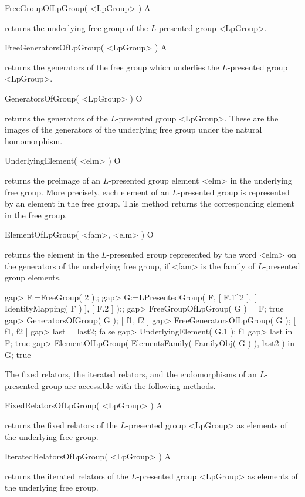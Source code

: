\> FreeGroupOfLpGroup( <LpGroup> ) A

returns the underlying free group of the $L$-presented group <LpGroup>. 

\> FreeGeneratorsOfLpGroup( <LpGroup> ) A

returns the generators of the free group which underlies the $L$-presented
group <LpGroup>.

\> GeneratorsOfGroup( <LpGroup> )  O
 
returns the generators of the $L$-presented group <LpGroup>. These are the 
images of the generators of the underlying free group under the natural
homomorphism.

\> UnderlyingElement( <elm> ) O

returns the preimage of an $L$-presented group element <elm> in the
underlying free group. More precisely, each element of an $L$-presented
group is represented by an element in the free group. This method returns
the corresponding element in the free group.

\> ElementOfLpGroup( <fam>, <elm> ) O

returns the element in the $L$-presented group represented by the word
<elm> on the generators of the underlying free group, if <fam> is the
family of $L$-presented group elements.

\beginexample
gap> F:=FreeGroup( 2 );;
gap> G:=LPresentedGroup( F, [ F.1^2 ], [ IdentityMapping( F ) ], [ F.2 ] );;
gap> FreeGroupOfLpGroup( G ) = F;
true
gap> GeneratorsOfGroup( G );
[ f1, f2 ]
gap> FreeGeneratorsOfLpGroup( G );
[ f1, f2 ]
gap> last = last2;
false
gap> UnderlyingElement( G.1 );
f1
gap> last in F;
true
gap> ElementOfLpGroup( ElementsFamily( FamilyObj( G ) ), last2 ) in G;
true
\endexample


The fixed relators, the iterated relators, and the endomorphisms of an
$L$-presented group are accessible with the following methods.

\> FixedRelatorsOfLpGroup( <LpGroup> ) A

returns the fixed relators of the $L$-presented group <LpGroup> as elements
of the underlying free group.

\> IteratedRelatorsOfLpGroup( <LpGroup> ) A

returns the iterated relators of the $L$-presented group <LpGroup>
as elements of the underlying free group.

